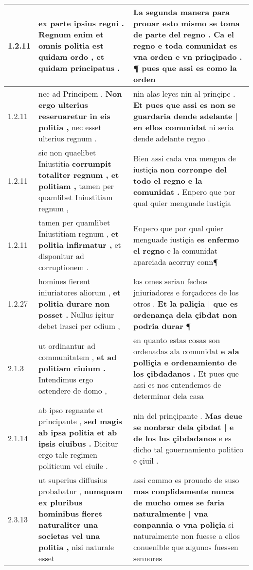 \begin{tabular}{|p{1cm}|p{6.5cm}|p{6.5cm}|}

\hline
1.2.11 & ex parte ipsius regni . \textbf{ Regnum enim et omnis politia est quidam ordo , } et quidam principatus . & La segunda manera para prouar esto mismo se toma de parte del regno . \textbf{ Ca el regno e toda comunidat es vna orden e vn prinçipado . } ¶ pues que assi es como la orden \\\hline
1.2.11 & nec ad Principem . \textbf{ Non ergo ulterius reseruaretur in eis politia , } nec esset ulterius regnum . & nin alas leyes nin al prinçipe . \textbf{ Et pues que assi es non se guardaria dende adelante | en ellos comunidat } ni seria dende adelante regno . \\\hline
1.2.11 & sic non quaelibet Iniustitia \textbf{ corrumpit totaliter regnum , et politiam , } tamen per quamlibet Iniustitiam regnum , & Bien assi cada vna mengua de iustiçia \textbf{ non corronpe del todo el regno e la comunidat . } Enpero que por qual quier menguade iustiçia \\\hline
1.2.11 & tamen per quamlibet Iniustitiam regnum , \textbf{ et politia infirmatur , } et disponitur ad corruptionem . & Enpero que por qual quier menguade iustiçia \textbf{ es enfermo el regno } e la comunidat apareiada acorruy conn¶ \\\hline
1.2.27 & homines fierent iniuriatores aliorum , \textbf{ et politia durare non posset . } Nullus igitur debet irasci per odium , & los omes serian fechos jniuriadores e forçadores de los otros . \textbf{ Et la paliçia | que es ordenança dela çibdat non podria durar } ¶ \\\hline
2.1.3 & ut ordinantur ad communitatem , \textbf{ et ad politiam ciuium . } Intendimus ergo ostendere de domo , & en quanto estas cosas son ordenadas ala comunidat \textbf{ e ala polliçia e ordenamiento de los çibdadanos . } Et pues que assi es nos entendemos de determinar dela casa \\\hline
2.1.14 & ab ipso regnante et principante , \textbf{ sed magis ab ipsa politia et ab ipsis ciuibus . } Dicitur ergo tale regimen politicum vel ciuile . & nin del prinçipante . \textbf{ Mas deue se nonbrar dela çibdat | e de los lus çibdadanos } e es dicho tal gouernamiento politico e çiuil . \\\hline
2.3.13 & ut superius diffusius probabatur , \textbf{ numquam ex pluribus hominibus fieret naturaliter una societas vel una politia , } nisi naturale esset & assi commo es prouado de suso \textbf{ mas conplidamente nunca de mucho omes se faria naturalmente | vna conpannia o vna poliçia } si naturalmente non fuesse a ellos conuenible que algunos fuessen sennores \\\hline

\end{tabular}
